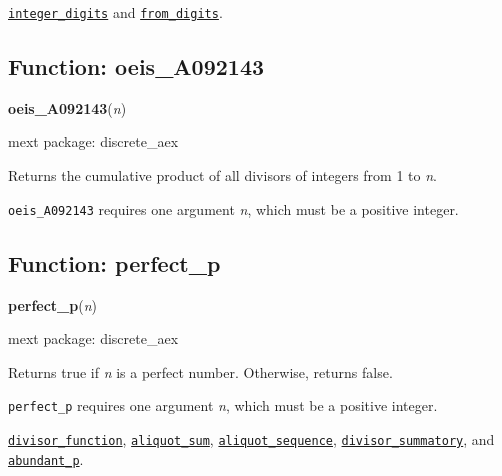 \documentclass[]{article}
\begin{document}
\vspace{5 pt}


 \hyperlink{integer_digits}{{\tt integer\_digits}} and \hyperlink{from_digits}{{\tt from\_digits}}.

\vspace{5 pt}


\subsection{Function: oeis\_A092143\label{sec:oeis_A092143}}
\hypertarget{oeis_A092143}{}
{\bf oeis\_A092143}({\it n})


\noindent mext package: discrete\_aex



\vspace{5 pt}
Returns the cumulative product of all divisors of integers from 1 to {\it n}. 

\vspace{5 pt}

   {\tt oeis\_A092143} requires one argument {\it n}, which must be a positive integer.


\vspace{5 pt}


\subsection{Function: perfect\_p\label{sec:perfect_p}}
\hypertarget{perfect_p}{}
{\bf perfect\_p}({\it n})


\noindent mext package: discrete\_aex



\vspace{5 pt}
Returns true if {\it n} is a perfect number. Otherwise, returns false. 

\vspace{5 pt}

   {\tt perfect\_p} requires one argument {\it n}, which must be a positive integer.


\vspace{5 pt}


  \hyperlink{divisor_function}{{\tt divisor\_function}}, \hyperlink{aliquot_sum}{{\tt aliquot\_sum}}, \hyperlink{aliquot_sequence}{{\tt aliquot\_sequence}}, \hyperlink{divisor_summatory}{{\tt divisor\_summatory}}, and \hyperlink{abundant_p}{{\tt abundant\_p}}.
\end{document}
